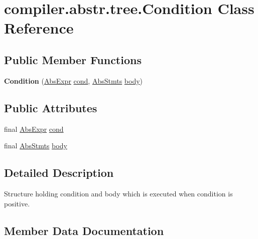 \hypertarget{classcompiler_1_1abstr_1_1tree_1_1_condition}{}\section{compiler.\+abstr.\+tree.\+Condition Class Reference}
\label{classcompiler_1_1abstr_1_1tree_1_1_condition}
\subsection*{Public Member Functions}
\begin{DoxyCompactItemize}
\item 
\mbox{\label{classcompiler_1_1abstr_1_1tree_1_1_condition_a50034d244720284f47984ef600d5b00c}} 
{\bfseries Condition} (\hyperlink{classcompiler_1_1abstr_1_1tree_1_1expr_1_1_abs_expr}{Abs\+Expr} \hyperlink{classcompiler_1_1abstr_1_1tree_1_1_condition_a0b23563b552baed42fce3b2878fdcb58}{cond}, \hyperlink{classcompiler_1_1abstr_1_1tree_1_1_abs_stmts}{Abs\+Stmts} \hyperlink{classcompiler_1_1abstr_1_1tree_1_1_condition_a3e728e36019d741f4a914d0508e68848}{body})
\end{DoxyCompactItemize}
\subsection*{Public Attributes}
\begin{DoxyCompactItemize}
\item 
final \hyperlink{classcompiler_1_1abstr_1_1tree_1_1expr_1_1_abs_expr}{Abs\+Expr} \hyperlink{classcompiler_1_1abstr_1_1tree_1_1_condition_a0b23563b552baed42fce3b2878fdcb58}{cond}
\item 
final \hyperlink{classcompiler_1_1abstr_1_1tree_1_1_abs_stmts}{Abs\+Stmts} \hyperlink{classcompiler_1_1abstr_1_1tree_1_1_condition_a3e728e36019d741f4a914d0508e68848}{body}
\end{DoxyCompactItemize}


\subsection{Detailed Description}
Structure holding condition and body which is executed when condition is positive. 

\subsection{Member Data Documentation}
\mbox{\label{classcompiler_1_1abstr_1_1tree_1_1_condition_a3e728e36019d741f4a914d0508e68848}} 
